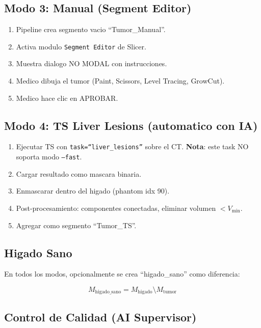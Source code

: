 \documentclass[12pt,a4paper]{article}
\begin{document}
\subsection{Modo 3: Manual (Segment Editor)}

\begin{enumerate}
    \item Pipeline crea segmento vacio ``Tumor\_Manual''.
    \item Activa modulo \texttt{Segment Editor} de Slicer.
    \item Muestra dialogo NO MODAL con instrucciones.
    \item Medico dibuja el tumor (Paint, Scissors, Level Tracing, GrowCut).
    \item Medico hace clic en APROBAR.
\end{enumerate}

\subsection{Modo 4: TS Liver Lesions (automatico con IA)}

\begin{enumerate}
    \item Ejecutar TS con \texttt{task=``liver\_lesions''} sobre el CT.
          \textbf{Nota}: este task NO soporta modo \texttt{--fast}.
    \item Cargar resultado como mascara binaria.
    \item Enmascarar dentro del higado (phantom idx 90).
    \item Post-procesamiento: componentes conectadas, eliminar volumen $< V_{\min}$.
    \item Agregar como segmento ``Tumor\_TS''.
\end{enumerate}

\subsection{Higado Sano}

En todos los modos, opcionalmente se crea ``higado\_sano'' como diferencia:

\begin{equation}\label{eq:higado_sano}
    M_{\text{higado\_sano}} = M_{\text{higado}} \setminus M_{\text{tumor}}
\end{equation}

\subsection{Control de Calidad (AI Supervisor)}
\end{document}
